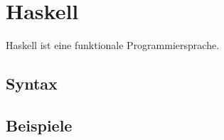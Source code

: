 \chapter{Haskell}
Haskell ist eine funktionale Programmiersprache.

\section{Syntax}
\section{Beispiele}
\inputminted[linenos, numbersep=5pt, tabsize=4, frame=lines, label=fibonacci.hs]{haskell}{scripts/haskell/fibonacci.hs}


